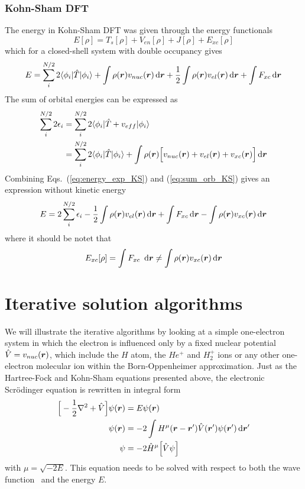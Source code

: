 \subsubsection{Kohn-Sham DFT}
The energy in Kohn-Sham DFT was given through the energy functionals
\begin{equation}
    E[\rho] = T_s[\rho] + V_{en}[\rho] + J[\rho] + E_{xc}[\rho]
\end{equation}
which for a closed-shell system with double occupancy gives
\begin{equation}
    \label{eq:energy_exp_KS}
    E = \sum_i^{N/2} 2\langle \phi_i|\hat{T}|\phi_i \rangle
	+ \int \rho(\boldsymbol r)v_{nuc}(\boldsymbol r) \,\mathrm{d}\boldsymbol r
	+ \frac{1}{2} \int \rho(\boldsymbol r)v_{el}(\boldsymbol r) \,\mathrm{d}\boldsymbol r
	+ \int F_{xc} \,\mathrm{d}\boldsymbol r
\end{equation}
The sum of orbital energies can be expressed as
\begin{align}
    \sum_i^{N/2} 2\epsilon_i 
	&= \sum_i^{N/2} 2\langle\phi_i|\hat{T} + v_{eff}|\phi_i\rangle\\
    \label{eq:sum_orb_KS}
	&= \sum_i^{N/2} 2\langle\phi_i|\hat{T}|\phi_i\rangle
	    + \int \rho(\boldsymbol r)\Big[v_{nuc}(\boldsymbol r)+v_{el}(\boldsymbol r)+v_{xc}(\boldsymbol r)\Big] \,\mathrm{d}\boldsymbol r
\end{align}
Combining Eqs.~(\ref{eq:energy_exp_KS}) and (\ref{eq:sum_orb_KS}) gives an expression without
kinetic energy
\begin{equation}
    E = 2 \sum_i^{N/2} \epsilon_i - \frac{1}{2} \int \rho(\boldsymbol r)v_{el}(\boldsymbol r) \,\mathrm{d}\boldsymbol r
	+ \int F_{xc} \,\mathrm{d}\boldsymbol r - \int \rho(\boldsymbol r)v_{xc}(\boldsymbol r) \,\mathrm{d}\boldsymbol r
\end{equation}
where it should be notet that
\begin{equation}
    E_{xc}[\rho] = \int F_{xc} \ud\bs{r} \neq \int \rho(\bs{r})v_{xc}(\bs{r}) \ud\bs{r}
\end{equation}

\section{Iterative solution algorithms}\label{sec:algorithms}
We will illustrate the iterative algorithms by looking at a simple one-electron system in which the 
electron is influenced only by a fixed nuclear potential $\hat{V} = v_{nuc}(\boldsymbol r)$, which include 
the $H$ atom, the $He^+$ and $H_2^+$ ions or any other one-electron molecular ion within the 
Born-Oppenheimer approximation. Just as the Hartree-Fock and Kohn-Sham equations presented above, 
the electronic Scr\"{o}dinger equation is rewritten in integral form
\begin{align}
    \Big[-\frac{1}{2}\nabla^2 + \hat{V}\Big]\psi(\boldsymbol r) &= E\psi(\boldsymbol r)\\
    \psi(\boldsymbol r)&=-2\int H^{\mu}(\boldsymbol r-\boldsymbol r')\hat{V}(\boldsymbol r')\psi(\boldsymbol r')\,\mathrm{d}\boldsymbol r'\\
    \label{eq:int_schr}
    \psi &= -2 \hat{H}^{\mu}\Big[\hat{V}\psi\Big]
\end{align}
with $\mu = \sqrt{-2E}$. This equation needs to be solved with respect to both the wave function
\wavefunction\ and the energy $E$.

